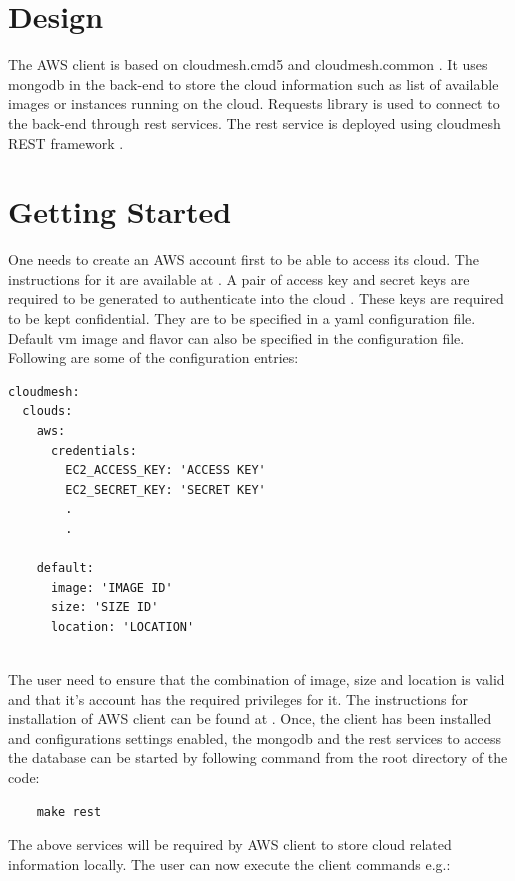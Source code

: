 \documentclass[9pt,twocolumn,twoside]{../../styles/osajnl}
\begin{document}
\section{Design}

The AWS client is based on cloudmesh.cmd5
\cite{www-cloudmesh-cmd5} and cloudmesh.common \cite{www-cloudmesh-common}. It uses
mongodb in the back-end to store the cloud information such as list of
available images or instances running on the cloud. Requests library
\cite{www-python-requests} is used to connect to the back-end through
rest services. The rest service is deployed using cloudmesh REST
framework \cite{www-cloudmesh-rest}.

\section{Getting Started}

One needs to create an AWS account first to be able to access its
cloud. The instructions for it are available at
\cite{www-amazon-aws}. A pair of access key and secret keys are
required to be generated to authenticate into the cloud
\cite{www-amazon-key}. These keys are required to be kept
confidential. They are to be specified in a yaml configuration
file. Default vm image and flavor can also be specified in the
configuration file. Following are some of the configuration entries:

\begin{verbatim} 
cloudmesh:
  clouds:
    aws:
      credentials:
        EC2_ACCESS_KEY: 'ACCESS KEY'
        EC2_SECRET_KEY: 'SECRET KEY'
        .
        .

    default:
      image: 'IMAGE ID'
      size: 'SIZE ID'
      location: 'LOCATION'
	  
\end{verbatim}

The user need to ensure that the combination of image, size and
location is valid and that it's account has the required privileges
for it. The instructions for installation of AWS client can be found
at \cite{www-cloudmesh-aws}. Once, the client has been installed and
configurations settings enabled, the mongodb and the rest services to
access the database can be started by following command from the root
directory of the code:

\begin{verbatim}
    make rest
\end{verbatim}

The above services will be required by AWS client to store cloud
related information locally. The user can now execute the client
commands e.g.:
\end{document}
